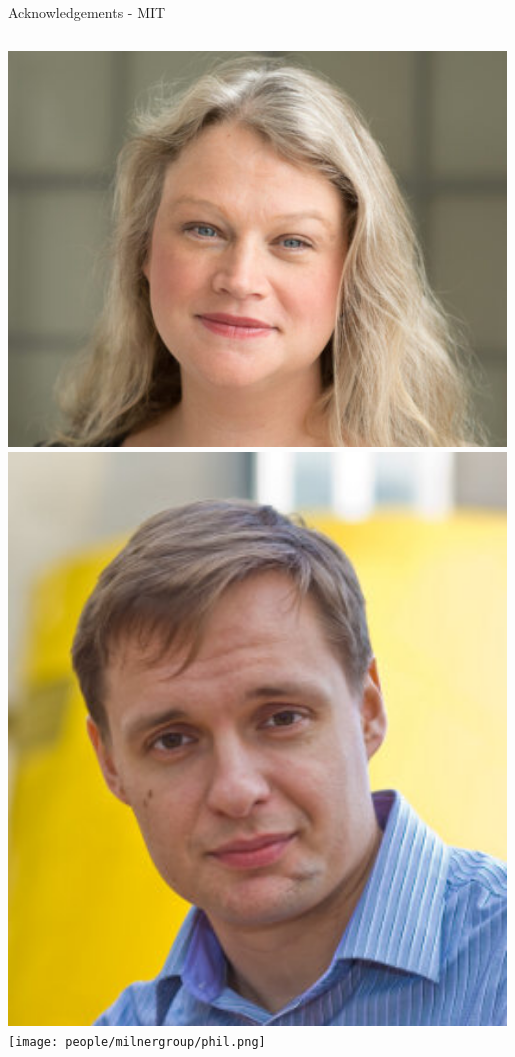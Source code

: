 \documentclass[aspectratio=169]{beamer}
\begin{document}
\begin{frame}{Acknowledgements - MIT}
\begin{columns}
            \includegraphics[width=0.99\textwidth]{people/milnergroup/lindley.png}
            \centering
            \includegraphics[width=0.99\textwidth]{people/milnergroup/yury.png}
            \texttt{[image: people/milnergroup/phil.png]}
        \end{columns}   
        

\end{frame}
\end{document}
